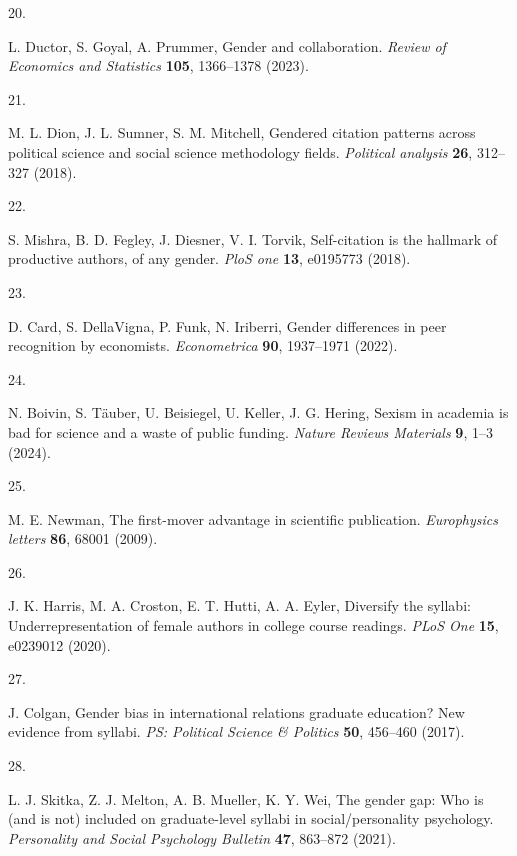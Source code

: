 \documentclass[
  11pt,
]{article}
\newlength{\cslhangindent}
\newlength{\csllabelwidth}
\newenvironment{CSLReferences}[2] %
 {\begin{list}{}{%
  \setlength{\itemindent}{0pt}
  \setlength{\leftmargin}{0pt}
  \setlength{\parsep}{0pt}
  \ifodd #1
   \setlength{\leftmargin}{\cslhangindent}
   \setlength{\itemindent}{-1\cslhangindent}
  \fi
  \setlength{\itemsep}{#2\baselineskip}}}
 {\end{list}}
\newcommand{\CSLLeftMargin}[1]{\parbox[t]{\csllabelwidth}{\strut#1\strut}}
\newcommand{\CSLRightInline}[1]{\parbox[t]{\linewidth - \csllabelwidth}{\strut#1\strut}}
\begin{document}
\begin{CSLReferences}{0}{1}
\CSLLeftMargin{20. }%
\CSLRightInline{L. Ductor, S. Goyal, A. Prummer, Gender and collaboration. \emph{Review of Economics and Statistics} \textbf{105}, 1366--1378 (2023).}

\CSLLeftMargin{21. }%
\CSLRightInline{M. L. Dion, J. L. Sumner, S. M. Mitchell, Gendered citation patterns across political science and social science methodology fields. \emph{Political analysis} \textbf{26}, 312--327 (2018).}

\CSLLeftMargin{22. }%
\CSLRightInline{S. Mishra, B. D. Fegley, J. Diesner, V. I. Torvik, Self-citation is the hallmark of productive authors, of any gender. \emph{PloS one} \textbf{13}, e0195773 (2018).}

\CSLLeftMargin{23. }%
\CSLRightInline{D. Card, S. DellaVigna, P. Funk, N. Iriberri, Gender differences in peer recognition by economists. \emph{Econometrica} \textbf{90}, 1937--1971 (2022).}

\CSLLeftMargin{24. }%
\CSLRightInline{N. Boivin, S. Täuber, U. Beisiegel, U. Keller, J. G. Hering, Sexism in academia is bad for science and a waste of public funding. \emph{Nature Reviews Materials} \textbf{9}, 1--3 (2024).}

\CSLLeftMargin{25. }%
\CSLRightInline{M. E. Newman, The first-mover advantage in scientific publication. \emph{Europhysics letters} \textbf{86}, 68001 (2009).}

\CSLLeftMargin{26. }%
\CSLRightInline{J. K. Harris, M. A. Croston, E. T. Hutti, A. A. Eyler, Diversify the syllabi: Underrepresentation of female authors in college course readings. \emph{PLoS One} \textbf{15}, e0239012 (2020).}

\CSLLeftMargin{27. }%
\CSLRightInline{J. Colgan, Gender bias in international relations graduate education? New evidence from syllabi. \emph{PS: Political Science \& Politics} \textbf{50}, 456--460 (2017).}

\CSLLeftMargin{28. }%
\CSLRightInline{L. J. Skitka, Z. J. Melton, A. B. Mueller, K. Y. Wei, The gender gap: Who is (and is not) included on graduate-level syllabi in social/personality psychology. \emph{Personality and Social Psychology Bulletin} \textbf{47}, 863--872 (2021).}


\end{CSLReferences}
\end{document}
